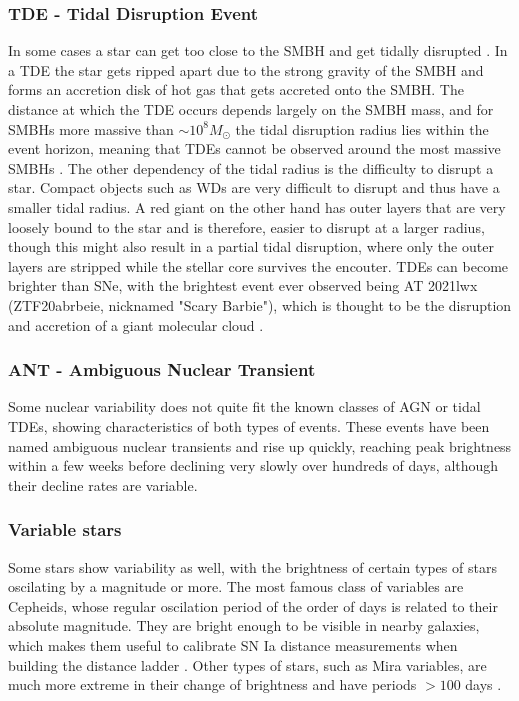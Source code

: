 \documentclass[a4paper,oneside,12pt, class=Latex/Classes/PhDthesisPSnPDF, crop=false]{standalone}
\begin{document}
\subsubsection{TDE - Tidal Disruption Event}
In some cases a star can get too close to the SMBH and get tidally disrupted \citep{Rees_1988_TDE, Strubbe_2009_TDE}. In a TDE the star gets ripped apart due to the strong gravity of the SMBH and forms an accretion disk of hot gas that gets accreted onto the SMBH. The distance at which the TDE occurs depends largely on the SMBH mass, and for SMBHs more massive than $\sim10^8 M_\odot$ the tidal disruption radius lies within the event horizon, meaning that TDEs cannot be observed around the most massive SMBHs \citep{Hills_mass}. The other dependency of the tidal radius is the difficulty to disrupt a star. Compact objects such as WDs are very difficult to disrupt and thus have a smaller tidal radius. A red giant on the other hand has outer layers that are very loosely bound to the star and is therefore, easier to disrupt at a larger radius, though this might also result in a partial tidal disruption, where only the outer layers are stripped while the stellar core survives the encouter. TDEs can become brighter than SNe, with the brightest event ever observed being AT 2021lwx (ZTF20abrbeie, nicknamed "Scary Barbie"), which is thought to be the disruption and accretion of a giant molecular cloud \citep{Scary_Barbie, 2021lwx_Wiseman}.


\subsubsection{ANT - Ambiguous Nuclear Transient}
 Some nuclear variability does not quite fit the known classes of AGN or tidal TDEs, showing characteristics of both types of events. These events have been named ambiguous nuclear transients \citep[ANTS;][]{Kankare_ANT, 2020ohl_Hinkle, Hinkle_MIR_ANT_echo, Hinkle_Extreme_nuclear_transients/ANTs, wiseman_ztfants} and rise up quickly, reaching peak brightness within a few weeks before declining very slowly over hundreds of days, although their decline rates are variable. 


\subsubsection{Variable stars}
Some stars show variability as well, with the brightness of certain types of stars oscilating by a magnitude or more. The most famous class of variables are Cepheids, whose regular oscilation period of the order of days is related to their absolute magnitude. They are bright enough to be visible in nearby galaxies, which makes them useful to calibrate SN Ia distance measurements when building the distance ladder \citep{Cepheids_Gibson, Cepheids_Saha}. Other types of stars, such as Mira variables, are much more extreme in their change of brightness and have periods $>100$ days \citep{Mira_varibs}.
\end{document}
